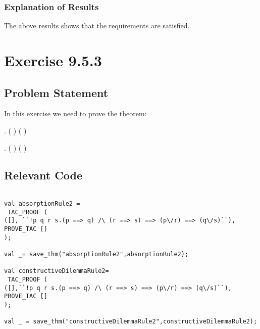\documentclass{report}
\begin{document}
\subsection{Explanation of Results}
\label{sec:explanation-results-2}
The above results shows that the requirements are satisfied.



 \chapter{Exercise 9.5.3}
 \label{cha:exercise-9.5.3}
  
 \section{Problem Statement}
 \label{sec:problem-statement-3}

In this exercise we need to prove the theorem:  

\HOLTokenTurnstile{} \HOLSymConst{\HOLTokenForall{}}   . ( \HOLSymConst{\HOLTokenImp{}} ) \HOLSymConst{\HOLTokenConj{}} ( \HOLSymConst{\HOLTokenImp{}} ) \HOLSymConst{\HOLTokenImp{}}  \HOLSymConst{\HOLTokenDisj{}}  \HOLSymConst{\HOLTokenImp{}}  \HOLSymConst{\HOLTokenDisj{}} 

\HOLTokenTurnstile{} \HOLSymConst{\HOLTokenForall{}}   . ( \HOLSymConst{\HOLTokenImp{}} ) \HOLSymConst{\HOLTokenConj{}} ( \HOLSymConst{\HOLTokenImp{}} ) \HOLSymConst{\HOLTokenImp{}}  \HOLSymConst{\HOLTokenDisj{}}  \HOLSymConst{\HOLTokenImp{}}  \HOLSymConst{\HOLTokenDisj{}} 

\section{Relevant Code}
\label{sec:relevant-code-3}
 \lstset{frameround=fftt}
\begin{lstlisting}[frame=tRBL]

val absorptionRule2 =
 TAC_PROOF (
([], ``!p q r s.(p ==> q) /\ (r ==> s) ==> (p\/r) ==> (q\/s)``),
PROVE_TAC []
);

val _= save_thm("absorptionRule2",absorptionRule2);

val constructiveDilemmaRule2=
 TAC_PROOF (
([],``!p q r s.(p ==> q) /\ (r ==> s) ==> (p\/r) ==> (q\/s)``),
PROVE_TAC []
);

val _ = save_thm("constructiveDilemmaRule2",constructiveDilemmaRule2);

\end{lstlisting}
\end{document}
